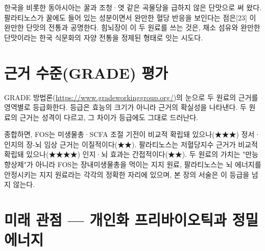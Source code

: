 \documentclass[12pt,oneside]{book}
\begin{document}
한국을 비롯한 동아시아는 꿀과 조청·엿 같은 곡물당을 급하지 않은 단맛으로 써 왔다. 팔라티노스가 꿀에도 들어 있는 성분이면서 완만한 혈당 반응을 보인다는 점은[23] 이 완만한 단맛의 전통과 공명한다. 힘뇌장이 이 두 원료를 쓰는 것은, 채소 섬유와 완만한 단맛이라는 한국 식문화의 자양 전통을 정제된 형태로 잇는 시도다.

\section{근거 수준(GRADE) 평가}

GRADE 방법론(\url{https://www.gradeworkinggroup.org/})의 눈으로 두 원료의 근거를 영역별로 등급화한다. 등급은 효능의 크기가 아니라 근거의 확실성을 나타낸다. 두 원료의 근거는 성격이 다르고, 그 차이가 등급에도 그대로 드러난다.

\vspace{2pt}\vspace{3pt}

종합하면, FOS는 미생물총·SCFA 조절 기전이 비교적 확립돼 있으나(★★★) 정서·인지의 장-뇌 임상 근거는 이질적이다(★★). 팔라티노스는 저혈당지수 근거가 비교적 확립돼 있으나(★★★★) 인지·뇌 효과는 간접적이다(★★). 두 원료의 가치는 "만능 향상제"가 아니라 FOS는 장내미생물총을 먹이는 지지 원료, 팔라티노스는 뇌 에너지를 안정시키는 지지 원료라는 각각의 정확한 자리에 있으며, 본 장의 서술은 이 등급을 넘지 않는다.

\section{미래 관점 — 개인화 프리바이오틱과 정밀 에너지}
\end{document}
